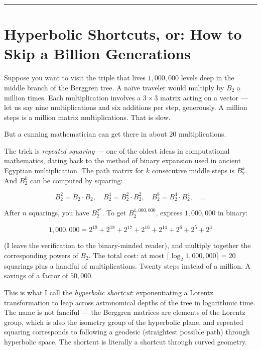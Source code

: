 \documentclass[11pt,openany]{book}
\theoremstyle{definition}
\theoremstyle{plain}
\theoremstyle{remark}
\begin{document}
\bigskip\noindent\rule{\textwidth}{0.4pt}\bigskip


\section*{Hyperbolic Shortcuts, or: How to Skip a Billion Generations}


Suppose you want to visit the triple that lives $1{,}000{,}000$ levels deep in the middle branch of the Berggren tree. A naïve traveler would multiply by $B_2$ a million times. Each multiplication involves a $3 \times 3$ matrix acting on a vector — let us say nine multiplications and six additions per step, generously. A million steps is a million matrix multiplications. That is slow.

But a cunning mathematician can get there in about $20$ multiplications.

The trick is \textit{repeated squaring} — one of the oldest ideas in computational mathematics, dating back to the method of binary expansion used in ancient Egyptian multiplication. The path matrix for $k$ consecutive middle steps is $B_2^k$. And $B_2^k$ can be computed by squaring:

$$B_2^2 = B_2 \cdot B_2, \quad B_2^4 = B_2^2 \cdot B_2^2, \quad B_2^8 = B_2^4 \cdot B_2^4, \quad \ldots$$

After $n$ squarings, you have $B_2^{2^n}$. To get $B_2^{1{,}000{,}000}$, express $1{,}000{,}000$ in binary:

$$1{,}000{,}000 = 2^{19} + 2^{18} + 2^{17} + 2^{16} + 2^{14} + 2^{6} + 2^5 + 2^3$$

(I leave the verification to the binary-minded reader), and multiply together the corresponding powers of $B_2$. The total cost: at most $\lceil \log_2 1{,}000{,}000 \rceil = 20$ squarings plus a handful of multiplications. Twenty steps instead of a million. A savings of a factor of $50{,}000$.

This is what I call the \textit{hyperbolic shortcut}: exponentiating a Lorentz transformation to leap across astronomical depths of the tree in logarithmic time. The name is not fanciful — the Berggren matrices are elements of the Lorentz group, which is also the isometry group of the hyperbolic plane, and repeated squaring corresponds to following a geodesic (straightest possible path) through hyperbolic space. The shortcut is literally a shortcut through curved geometry.
\end{document}
